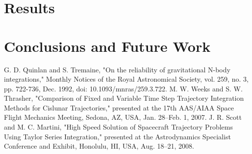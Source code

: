\documentclass[conference]{IEEEtran}
\begin{document}
	\section{Results}
	
	\section{Conclusions and Future Work}
	
	\begin{thebibliography}{00}
		 G. D. Quinlan and S. Tremaine, "On the reliability of gravitational N-body integrations," Monthly Notices of the Royal Astronomical Society, vol. 259, no. 3, pp. 722-736, Dec. 1992, doi: 10.1093/mnras/259.3.722.
		 M. W. Weeks and S. W. Thrasher, "Comparison of Fixed and Variable Time Step Trajectory Integration Methods for Cislunar Trajectories," presented at the 17th AAS/AIAA Space Flight Mechanics Meeting, Sedona, AZ, USA, Jan. 28–Feb. 1, 2007.
		 J. R. Scott and M. C. Martini, "High Speed Solution of Spacecraft Trajectory Problems Using Taylor Series Integration," presented at the Astrodynamics Specialist Conference and Exhibit, Honolulu, HI, USA, Aug. 18–21, 2008. 
		
	\end{thebibliography}
	
\end{document}
